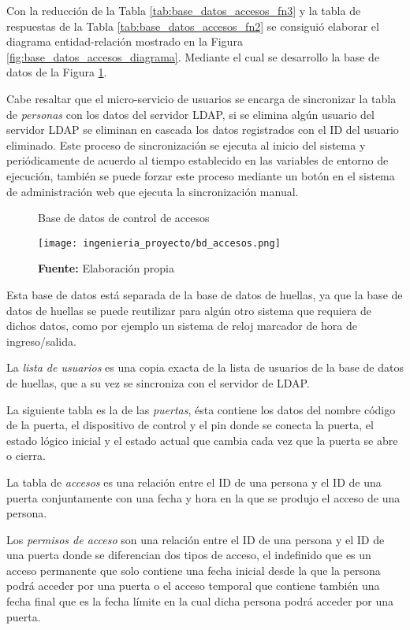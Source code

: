 \documentclass[../principal]{subfiles}
\begin{document}
  Con la reducción de la Tabla \ref{tab:base_datos_accesos_fn3} y la tabla de respuestas de la Tabla \ref{tab:base_datos_accesos_fn2} se consiguió elaborar el diagrama entidad-relación mostrado en la Figura \ref{fig:base_datos_accesos_diagrama}. Mediante el cual se desarrollo la base de datos de la Figura \ref{fig:bd_accesos}.

  Cabe resaltar que el micro-servicio de usuarios se encarga de sincronizar la tabla de \textit{personas} con los datos del servidor LDAP, si se elimina algún usuario del servidor LDAP se eliminan en cascada los datos registrados con el ID del usuario eliminado. Este proceso de sincronización se ejecuta al inicio del sistema y periódicamente de acuerdo al tiempo establecido en las variables de entorno de ejecución, también se puede forzar este proceso mediante un botón en el sistema de administración web que ejecuta la sincronización manual.

  \begin{figure}[H]
    \centering
    \caption{Base de datos de control de accesos}
    \texttt{[image: ingenieria\_proyecto/bd\_accesos.png]}
    \caption*{\textbf{Fuente:} Elaboración propia}
    \label{fig:bd_accesos}
  \end{figure}

  Esta base de datos está separada de la base de datos de huellas, ya que la base de datos de huellas se puede reutilizar para algún otro sistema que requiera de dichos datos, como por ejemplo un sistema de reloj marcador de hora de ingreso/salida.

  La \textit{lista de usuarios} es una copia exacta de la lista de usuarios de la base de datos de huellas, que a su vez se sincroniza con el servidor de LDAP.

  La siguiente tabla es la de las \textit{puertas}, ésta contiene los datos del nombre código de la puerta, el dispositivo de control y el pin donde se conecta la puerta, el estado lógico inicial y el estado actual que cambia cada vez que la puerta se abre o cierra.

  La tabla de \textit{accesos} es una relación entre el ID de una persona y el ID de una puerta conjuntamente con una fecha y hora en la que se produjo el acceso de una persona.

  Los \textit{permisos de acceso} son una relación entre el ID de una persona y el ID de una puerta donde se diferencian dos tipos de acceso, el indefinido que es un acceso permanente que solo contiene una fecha inicial desde la que la persona podrá acceder por una puerta o el acceso temporal que contiene también una fecha final que es la fecha límite en la cual dicha persona podrá acceder por una puerta.
\end{document}
